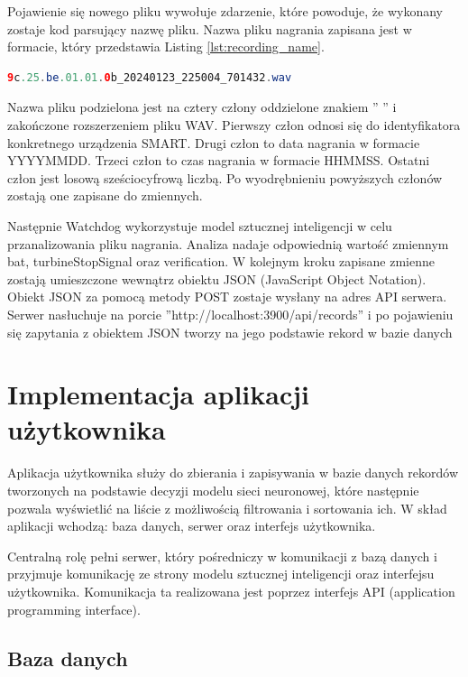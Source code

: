 \documentclass{sprz}
\begin{document}
Pojawienie się nowego pliku wywołuje zdarzenie, które powoduje, że wykonany zostaje kod parsujący nazwę pliku. Nazwa pliku nagrania zapisana jest w formacie, który przedstawia Listing \ref{lst:recording_name}.

\begin{lstlisting}[language=Java,caption={Przykładowa nazwa pliku nagrania}, label={lst:recording_name}]
  9c.25.be.01.01.0b_20240123_225004_701432.wav
\end{lstlisting}

Nazwa pliku podzielona jest na cztery człony oddzielone znakiem ” ” i zakończone rozszerzeniem pliku WAV. Pierwszy człon odnosi się do identyfikatora konkretnego urządzenia SMART. Drugi człon to data nagrania w formacie YYYYMMDD. Trzeci człon to czas nagrania w formacie HHMMSS. Ostatni człon jest losową sześciocyfrową liczbą. Po wyodrębnieniu powyższych członów zostają one zapisane do zmiennych.


Następnie Watchdog wykorzystuje model sztucznej inteligencji w celu przanalizowania pliku nagrania. Analiza nadaje odpowiednią wartość zmiennym bat, turbineStopSignal oraz verification. W kolejnym kroku zapisane zmienne zostają umieszczone wewnątrz obiektu JSON (JavaScript Object Notation). Obiekt JSON za pomocą metody POST zostaje wysłany na adres API serwera.
Serwer nasłuchuje na porcie ”http://localhost:3900/api/records” i po pojawieniu się zapytania z obiektem JSON tworzy na jego podstawie rekord w bazie danych


\clearpage


\chapter{Implementacja aplikacji użytkownika}

Aplikacja użytkownika służy do zbierania i zapisywania w bazie danych rekordów tworzonych na podstawie decyzji modelu sieci neuronowej, które następnie pozwala wyświetlić na liście z możliwością filtrowania i sortowania ich. W skład aplikacji wchodzą: baza danych, serwer oraz interfejs użytkownika.

Centralną rolę pełni serwer, który pośredniczy w komunikacji z bazą danych i przyjmuje komunikację ze strony modelu sztucznej inteligencji oraz interfejsu użytkownika. Komunikacja ta realizowana jest poprzez interfejs API (application programming interface).
\clearpage

\section{Baza danych}
\end{document}
